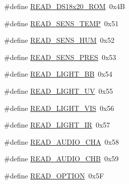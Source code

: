 \begin{DoxyCompactItemize}
\item 
\#define \hyperlink{share_2OWPJON-sensor-commands_8h_a7ca8c60e0479524189c52f6179a18244}{R\-E\-A\-D\-\_\-\-D\-S18x20\-\_\-\-R\-O\-M}~0x4\-B
\item 
\#define \hyperlink{share_2OWPJON-sensor-commands_8h_abfa0d681f8159a1dd991b3734bcbfafe}{R\-E\-A\-D\-\_\-\-S\-E\-N\-S\-\_\-\-T\-E\-M\-P}~0x51
\item 
\#define \hyperlink{share_2OWPJON-sensor-commands_8h_a1ee349c5e6ced7ed94623b7eda7564ee}{R\-E\-A\-D\-\_\-\-S\-E\-N\-S\-\_\-\-H\-U\-M}~0x52
\item 
\#define \hyperlink{share_2OWPJON-sensor-commands_8h_af001fcaefc36ae447063ed0e58a48e9b}{R\-E\-A\-D\-\_\-\-S\-E\-N\-S\-\_\-\-P\-R\-E\-S}~0x53
\item 
\#define \hyperlink{share_2OWPJON-sensor-commands_8h_acf9c86d9fdc475b97b7bd2c59fcbdeb2}{R\-E\-A\-D\-\_\-\-L\-I\-G\-H\-T\-\_\-\-B\-B}~0x54
\item 
\#define \hyperlink{share_2OWPJON-sensor-commands_8h_ab00ba7faf37b88f9cec76315c9f7ed08}{R\-E\-A\-D\-\_\-\-L\-I\-G\-H\-T\-\_\-\-U\-V}~0x55
\item 
\#define \hyperlink{share_2OWPJON-sensor-commands_8h_a626f04a65a8bc4eaaa2ae43ec2792b42}{R\-E\-A\-D\-\_\-\-L\-I\-G\-H\-T\-\_\-\-V\-I\-S}~0x56
\item 
\#define \hyperlink{share_2OWPJON-sensor-commands_8h_adb68d0cc842f92f9b1175aff9d1ccf8a}{R\-E\-A\-D\-\_\-\-L\-I\-G\-H\-T\-\_\-\-I\-R}~0x57
\item 
\#define \hyperlink{share_2OWPJON-sensor-commands_8h_ae5a2733d8781766c53251fa0641b6dc9}{R\-E\-A\-D\-\_\-\-A\-U\-D\-I\-O\-\_\-\-C\-H\-A}~0x58
\item 
\#define \hyperlink{share_2OWPJON-sensor-commands_8h_aaddf5aaf652906610cdf6001266d69b2}{R\-E\-A\-D\-\_\-\-A\-U\-D\-I\-O\-\_\-\-C\-H\-B}~0x59
\item 
\#define \hyperlink{share_2OWPJON-sensor-commands_8h_a80e888fca9e26b7797e8902d96c1d0bf}{R\-E\-A\-D\-\_\-\-O\-P\-T\-I\-O\-N}~0x5\-F
\end{DoxyCompactItemize}


